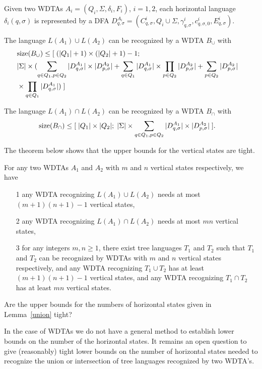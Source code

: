 \documentclass[copyright]{eptcs}
\begin{document}
\begin{lemma}\label{union}
Given two WDTAs $A_i=(Q_i,\Sigma,\delta_i,F_i)$, $i=1,2$, each
horizontal language $\delta_i(q,\sigma)$ is represented by a DFA
$D_{q,\sigma}^{A_i}=(C_{q,\sigma}^i, Q_i \cup \Sigma,
\gamma_{q,\sigma}^i, c_{q,\sigma,0}^i, E_{q,\sigma}^i)$.

The language $L(A_1)\cup L(A_2)$ can be recognized by a WDTA
$B_{\cup}$ with
\begin{eqnarray*} \ & {\rm size}(B_{\cup}) \leq [
\; (|Q_1|+1)\times (|Q_2|+1)-1;
&\ \\
\ & |\Sigma| \times (\sum_{q \in Q_1,p \in
Q_2}|D_{q,\sigma}^{A_1}| \times |D_{p,\sigma}^{A_2}| + \sum_{q\in
Q_1}|D_{q,\sigma}^{A_1}|\times \prod_{p \in
Q_2}|D_{p,\sigma}^{A_2}| + \sum_{p\in Q_2}|D_{p,\sigma}^{A_2}|
&\
\\
\ & \times \prod_{q \in Q_1}|D_{q,\sigma}^{A_1}|) \; ] &
\end{eqnarray*}

The language $L(A_1)\cap L(A_2)$ can be recognized by a WDTA
$B_{\cap}$ with \begin{eqnarray*}\ & {\rm size}(B_{\cap}) \leq [
\; |Q_1|\times |Q_2|; \; |\Sigma| \times \sum_{q \in Q_1,p\in Q_2}
|D_{q,\sigma}^{A_1}| \times |D_{p,\sigma}^{A_2}| \; ].&\
\end{eqnarray*}
\end{lemma}
The theorem below shows that the upper bounds for the vertical
states are tight.

\begin{theorem}\label{dtadfa}
For any two WDTAs $A_1$ and $A_2$ with $m$ and $n$ vertical states
respectively, we have
\begin{itemize}
  \item[1] any WDTA recognizing $L(A_1)\cup L(A_2)$ needs at
  most $(m+1)(n+1)-1$ vertical states,
  \item[2] any WDTA recognizing $L(A_1)\cap L(A_2)$ needs at
  most $mn$ vertical states,
  \item[3] for any integers $m,n\geq 1$, there exist tree languages $T_1$
  and $T_2$ such that $T_1$ and $T_2$ can be recognized by
  WDTAs with $m$ and $n$ vertical states respectively, and any WDTA
  recognizing $T_1 \cup T_2$ has at least $(m+1)(n+1)-1$ vertical
  states, and any WDTA recognizing $T_1 \cap T_2$ has at least $mn$ vertical
  states.
\end{itemize}
\end{theorem}


\begin{problem}
Are the upper bounds for the numbers of horizontal states given in
Lemma~\ref{union} tight?
\end{problem}
In the case of WDTAs we do not have
a general method to establish lower bounds on the number of the horizontal states.
It remains an open question to give (reasonably) tight lower
bounds on the number of horizontal states needed to recognize the
union or intersection of tree languages recognized by two WDTA's.
\end{document}
